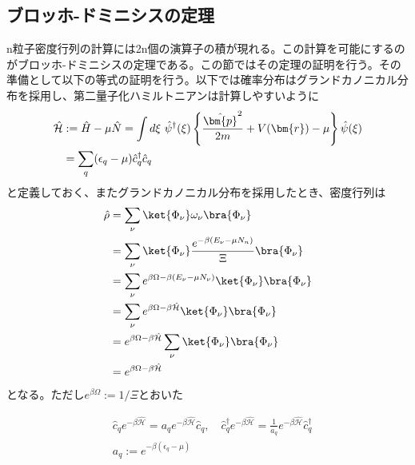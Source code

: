\documentclass[dvipdfmx, 11pt, a4paper]{jsarticle}
\numberwithin{equation}{section}
\theoremstyle{definition}
\begin{document}
\subsection{ブロッホ-ドミニシスの定理}
    n粒子密度行列の計算には2n個の演算子の積が現れる。この計算を可能にするのがブロッホ-ドミニシスの定理である。この節ではその定理の証明を行う。その準備として以下の等式の証明を行う。以下では確率分布はグランドカノニカル分布を採用し、第二量子化ハミルトニアンは計算しやすいように
    \begin{align}
        \hat{\mathcal{H}} &:= \hat{H} - \mu \hat{N} = \int d\xi\  \hat{\psi}^\dagger (\xi) \left\{ \frac{\hat{\bm{p}}^2}{2m} + V(\bm{r}) - \mu \right\} \hat{\psi}(\xi) \notag \\
        &= \sum_q (\epsilon_q - \mu) \hat{c}_q^\dagger \hat{c}_q 
    \end{align}
    と定義しておく、またグランドカノニカル分布を採用したとき、密度行列は
    \begin{align}
        \hat{\rho} &= \sum_\nu \ket{\Phi_\nu} \omega_\nu \bra{\Phi_\nu} \notag \\
        &= \sum_\nu \ket{\Phi_\nu} \frac{e^{-\beta(E_\nu - \mu N_n)}}{\Xi} \bra{\Phi_\nu} \notag \\
        &= \sum_\nu e^{\beta \Omega -\beta(E_\nu -\mu N_\nu )}\ket{\Phi_\nu}  \bra{\Phi_\nu} \notag \\
        &= \sum_\nu e^{\beta \Omega -\beta\hat{\mathcal{H}}}\ket{\Phi_\nu}  \bra{\Phi_\nu} \notag \\
        &= e^{\beta \Omega -\beta\hat{\mathcal{H}}} \sum_\nu \ket{\Phi_\nu}  \bra{\Phi_\nu} \notag \\
        &= e^{\beta \Omega -\beta\hat{\mathcal{H}}}
    \end{align}
    となる。ただし$e^{\beta \Omega}:= 1/\Xi $とおいた
    \begin{note}[準備]
        \begin{align}
            &\hat{c}_q e^{-\beta \hat{\mathcal{H}}} = a_q e^{-\beta \hat{\mathcal{H}}} \hat{c}_q,\quad \hat{c}_q^\dagger e^{-\beta \hat{\mathcal{H}}} = \frac{1}{a_q} e^{-\beta \hat{\mathcal{H}}} \hat{c}_q^\dagger \label{APN12}\\
            &a_q :=  e^{-\beta(\epsilon_q - \mu)}
        \end{align}
    \end{note}
\end{document}
